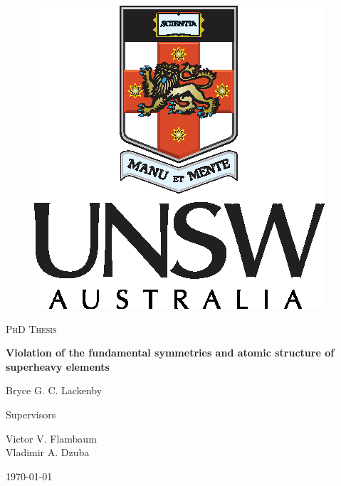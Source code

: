 \documentclass[10pt,a4paper, twoside, openright]{report}
\begin{document}
\begin{titlepage}
	\centering
	\begin{figure}
\centering
\includegraphics[scale=1]{./figures/unsw-crest.eps}
\captionsetup[figure]{list=no}
\end{figure}
    \captionsetup[figure]{list=no}
	\vspace{1cm}
	{\scshape\Large PhD Thesis\par}
	\vspace{1.5cm}
	{\huge\bfseries Violation of the fundamental symmetries and atomic structure of superheavy elements\par}
	\vspace{2cm}
	{\Large Bryce G. C. Lackenby \par}
	\vfill
	\raggedright
	Supervisors\par
	Victor V. Flambaum \\
	Vladimir A. Dzuba \\
	\centering

	\vfill

	{\large \today\par}
\end{titlepage}
\onehalfspacing

\tableofcontents
\end{document}
